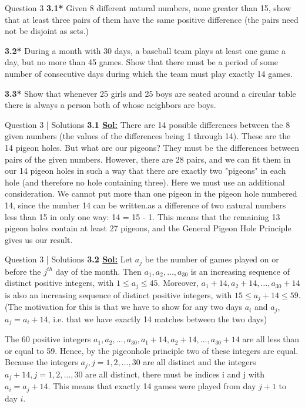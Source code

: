 \documentclass[xcolor=svgnames]{beamer}
\begin{document}
\begin{frame}{Question 3}
    \textbf{3.1*} Given 8 different natural numbers, none greater than 15, show that at least three pairs of them have the same positive difference (the pairs need not be disjoint as sets.) 
    
    \textbf{3.2*} During a month with 30 days, a baseball team plays at least one game a day, but no more than 45 games. Show that there must be a period of some number of consecutive days during which the team must play exactly 14 games.
    
    \textbf{3.3*} Show that whenever 25 girls and 25 boys are seated around a circular table there is always a person both of whose neighbors are boys.
\end{frame}

\begin{frame}{Question 3 | Solutions}
    \textbf{3.1 \underline{Sol:}} There are 14 possible differences between the 8 given numbers (the values of the differences being 1 through 14). These are the 14 pigeon holes. But what are our pigeons? They must be the differences between pairs of the given numbers. However, there are 28 pairs, and we can fit them in our 14 pigeon holes in such a way that there are exactly two "pigeons" in each hole (and therefore no hole containing three). Here we must use an additional consideration. We cannot put more than one pigeon in the pigeon hole numbered 14, since the number 14 can be written.as a difference of two natural numbers less than 15 in only one way: 14 = 15 - 1. This means that the remaining 13 pigeon holes contain at least 27 pigeons, and the General Pigeon Hole Principle gives us our result.
\end{frame}

\begin{frame}{Question 3 | Solutions}
    \textbf{3.2 \underline{Sol:}} Let $a_j$ be the number of games played on or before the $j^{th}$ day of the month. Then $a_1, a_2, \ldots, a_{30}$ is an increasing sequence of distinct positive integers, with $1 \leq a_j \leq 45$. Moreover, $a_1 + 14, a_2 + 14, \ldots , a_{30} + 14$ is also an increasing sequence of distinct positive integers, with $15 \leq a_j + 14 \leq 59$. (The motivation for this is that we have to show for any two days $a_i$ and $a_j$, $a_j = a_i + 14$, i.e. that we have exactly 14 matches between the two days)
    
    The 60 positive integers $a_{1}, a_{2}, \ldots , a_{30}, a_{1} + 14, a_{2} + 14, \ldots , a_{30} + 14$ are all less than or equal to 59. Hence, by the pigeonhole principle two of these integers are equal. Because the integers $a_j, j = 1, 2, \ldots , 30$ are all distinct and the integers $a_j + 14, j = 1, 2, \ldots , 30$ are all distinct, there must be indices i and j with $a_i = a_j + 14$. This means that exactly 14 games were played from day $j + 1$ to day $i$.
\end{frame}
\end{document}
